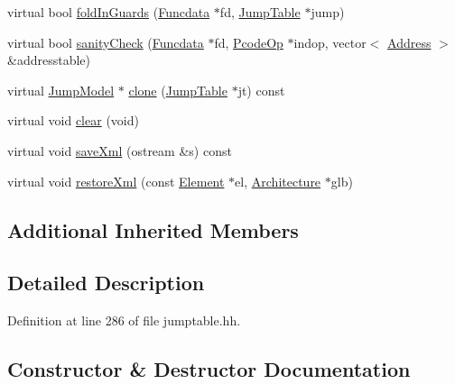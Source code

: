\begin{DoxyCompactItemize}
\item 
virtual bool \mbox{\hyperlink{class_jump_basic_override_a65b9faa5ee96e07e8a90ce492bc8c179}{fold\+In\+Guards}} (\mbox{\hyperlink{class_funcdata}{Funcdata}} $\ast$fd, \mbox{\hyperlink{class_jump_table}{Jump\+Table}} $\ast$jump)
\item 
virtual bool \mbox{\hyperlink{class_jump_basic_override_a050d3faa295ff61d04f1406443ac83b1}{sanity\+Check}} (\mbox{\hyperlink{class_funcdata}{Funcdata}} $\ast$fd, \mbox{\hyperlink{class_pcode_op}{Pcode\+Op}} $\ast$indop, vector$<$ \mbox{\hyperlink{class_address}{Address}} $>$ \&addresstable)
\item 
virtual \mbox{\hyperlink{class_jump_model}{Jump\+Model}} $\ast$ \mbox{\hyperlink{class_jump_basic_override_a139a81aba7b857ef37cf1ffa52e799b3}{clone}} (\mbox{\hyperlink{class_jump_table}{Jump\+Table}} $\ast$jt) const
\item 
virtual void \mbox{\hyperlink{class_jump_basic_override_a40c8f33ede7812c04d4f343ea1fc5f53}{clear}} (void)
\item 
virtual void \mbox{\hyperlink{class_jump_basic_override_a62070a61c5ab32dbc287c7b32e74bd64}{save\+Xml}} (ostream \&s) const
\item 
virtual void \mbox{\hyperlink{class_jump_basic_override_afc4f40d7eaff7e5a25804dc57323b9db}{restore\+Xml}} (const \mbox{\hyperlink{class_element}{Element}} $\ast$el, \mbox{\hyperlink{class_architecture}{Architecture}} $\ast$glb)
\end{DoxyCompactItemize}
\subsection*{Additional Inherited Members}


\subsection{Detailed Description}


Definition at line 286 of file jumptable.\+hh.



\subsection{Constructor \& Destructor Documentation}
\mbox{\label{class_jump_basic_override_aaae11fe384046c2f59bd4dd46f9c5a89}} 
